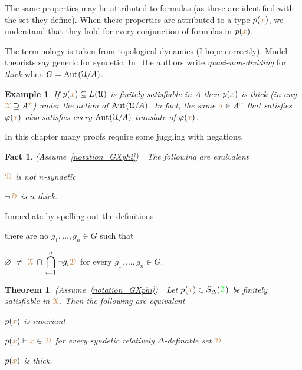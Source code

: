 \documentclass[10pt,openany]{amsproc}
\makeatletter
\newcommand{\mylabel}[1]{{\ssf{#1}}\hfill}
\renewenvironment{itemize}
  {\begin{list}{}{%
   \setlength{\parskip}{0mm}
   \setlength{\topsep}{.2\baselineskip}
   \setlength{\rightmargin}{0mm}
   \setlength{\listparindent}{0mm}
   \setlength{\itemindent}{0mm}
   \setlength{\labelwidth}{2ex}
   \setlength{\itemsep}{.1\baselineskip}
   \setlength{\parsep}{0mm}
   \setlength{\partopsep}{0mm}
   \setlength{\labelsep}{1ex}
   \setlength{\leftmargin}{\labelwidth+\labelsep}
   \let\makelabel\mylabel
   }}
   {\vspace*{-.3\baselineskip}\end{list}}
\def\proves{\vdash}
\def\Aut{{\rm Aut\kern.15ex}}
\def\D{\EuScript D}
\def\X{\EuScript X}
\def\Z{\EuScript Z}
\def\U{\EuScript U}
\def\0{\varnothing}
\def\phi{\varphi}
\def\ssf#1{\textsf{\small #1}}
\newcounter{thm}
\theoremstyle{mio}
\newtheorem{theorem}[thm]{Theorem}\tcolorboxenvironment{theorem}{mythm}
\newtheorem{fact}[thm]{Fact}\tcolorboxenvironment{fact}{mythm}
\newtheorem{example}[thm]{Example}\tcolorboxenvironment{example}{mythm}
\providecommand{\proofNameStyle}{\bfseries}
\renewenvironment{proof}[1][\proofname]{\par
  \pushQED{\qed}%
  \normalfont%
  \trivlist
  \item[\hskip\labelsep
        \proofNameStyle
    #1\@addpunct{.}]\ignorespaces
}{%
  \popQED\endtrivlist\@endpefalse
}
\def\mr{\color{brown}}
\def\gr{\color{green}}
\def\mrD{{\mr\D}}
\def\mrX{{\mr\X}}
\def\grZ{{\gr\Z}}
\makeatother
\begin{document}
The same properties may be attributed to formulas (as these are identified with the set they define).
When these properties are attributed to a type $p({\mr x})$, we understand that they hold for every conjunction of formulas in $p({\mr x})$.

The terminology is taken from topological dynamics (I hope correctly).
Model theorists say generic for syndetic.
In~\cite{CK} the authors write \textit{quasi-non-dividing\/} for \textit{thick\/} when $G=\Aut(\U/A)$.

\begin{example}
  If $p({\mr x})\subseteq L(\U)$ is finitely satisfiable in $A$ then $p({\mr x})$ is thick (in any $\mrX\supseteq A^{\mr x}$) under the action of $\Aut(\U/A)$.
  In fact, the same ${\mr a}\in A^{\mr x}$ that satisfies $\phi({\mr x})$ also satisfies every $\Aut(\U/A)$-translate of $\phi({\mr x})$.
\end{example}

In this chapter many proofs require some juggling with negations.

\begin{fact}\label{fact_fip}
  (Assume~\ref{notation_GXphi})\ \  
  The following are equivalent
  \begin{itemize}
    \item[1.] $\mrD$ is not $n$-syndetic
    \item[2.] $\neg\mrD$ is $n$-thick.
  \end{itemize}
\end{fact}

\begin{proof}
  Immediate by spelling out the definitions\smallskip
  \begin{itemize}
    \item[1.] there are no $g_1,\dots,g_n\in G$ such that \smash{$\displaystyle\mrX\ \subseteq\ \bigcup_{i=1}^n g_i{\mr\D}$}
    \item[2.]  $\displaystyle\0\ \neq\ \mrX\,\cap\,\bigcap_{i=1}^n\neg g_i{\mr\D}$ for every $g_1,\dots,g_n\in G$.\qedhere
  \end{itemize} 
\end{proof}

\begin{theorem}\label{thm_syndetic_invariant}
  (Assume~\ref{notation_GXphi})\ \  
  Let $p({\mr x})\in S_\Delta(\grZ)$ be finitely satisfiable in $\mrX$.
  Then the following are equivalent
  \begin{itemize}
    \item[1.] $p({\mr x})$ is invariant
    \item[2.] $p({\mr x})\proves{\mr x}\in\mrD$ for every syndetic relatively $\Delta$-definable set $\mrD$
    \item[3.] $p({\mr x})$ is thick.
  \end{itemize}
\end{theorem}
\end{document}
